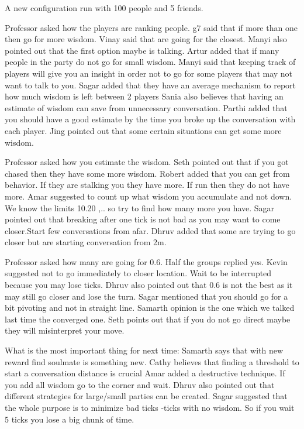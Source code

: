 A new configuration run with 100 people and 5 friends.

Professor asked how the players are ranking people.
g7 said that if more than one then go for more wisdom.
Vinay said that are going for the closest.
Manyi also pointed out that the first option maybe is talking.
Artur added that if many people in the party do not go for small wisdom.
Manyi said that keeping track of players will give you an insight in order not to go for some players that may not want to talk to you.
Sagar added that they have an average mechanism to report how much wisdom is left between 2 players
Sania also believes that having an estimate of wisdom can save from unnecessary conversation.
Parthi added that you should have a good estimate by the time you broke up the conversation with each player.
Jing pointed out that some certain situations can get some more wisdom.

Professor asked how you estimate the wisdom.
Seth pointed out that if you got chased then they have some more wisdom.
Robert added that you can get from behavior. If they are stalking you they have more. If run then they do not have more.
Amar suggested to count up what wisdom you accumulate and not down. We know the limits 10.20 ,.. so try to find how many more you have.
Sagar pointed out that breaking after one tick is not bad as you may want to come closer.Start few conversations from afar. 
Dhruv added that some are trying to go closer but are starting conversation from 2m.

Professor asked how many are going for 0.6.
Half the groups replied yes.
Kevin suggested not to go immediately to closer location. Wait to be interrupted because you may lose ticks.
Dhruv also pointed out that 0.6 is not the best as it may still go closer and lose the turn.
Sagar mentioned that you should go for a bit pivoting and not in straight line.
Samarth opinion is the one which we talked last time the converged one.
Seth points out that if you do not go direct maybe they will misinterpret your move.

What is the most important thing for next time:
Samarth says that with new reward find soulmate is something new.
Cathy believes that finding a threshold to start a conversation distance is crucial
Amar added a destructive technique. If you add all wisdom go to the corner and wait.
Dhruv also pointed out that different strategies for large/small parties can be created.
Sagar suggested that the whole purpose is to minimize bad ticks -ticks with no wisdom.
So if you wait 5 ticks you lose a big chunk of time.
